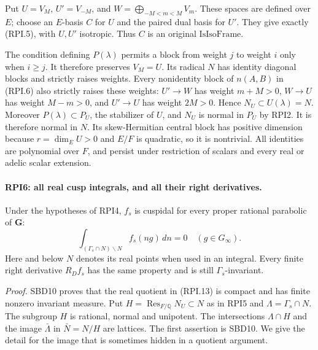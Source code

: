 Put \(U=V_M\), \(U'=V_{-M}\), and
\(W=\bigoplus_{-M<m<M}V_m\).  These spaces are defined over
\(E\); choose an \(E\)-basis \(C\) for \(U\) and the paired
dual basis for \(U'\).  They give exactly (RPI.5), with
\(U,U'\) isotropic.  Thus \(C\) is an original
\(\mathrm{IsIsoFrame}\).

The condition defining \(P(\lambda)\) permits a block from
weight \(j\) to weight \(i\) only when \(i\ge j\).
It therefore preserves \(V_M=U\).  Its radical \(N\) has
identity diagonal blocks and strictly raises weights.
Every nonidentity block of \(n(A,B)\) in (RPI.6) also strictly
raises these weights: \(U'\to W\) has weight \(m+M>0\),
\(W\to U\) has weight \(M-m>0\), and \(U'\to U\)
has weight \(2M>0\).  Hence \(N_U\subset U(\lambda)=N\).
Moreover \(P(\lambda)\subset P_U\), the stabilizer of \(U\),
and \(N_U\) is normal in \(P_U\) by RPI2.  It is therefore
normal in \(N\).  Its skew-Hermitian central block has
positive dimension because \(r=\dim_EU>0\) and \(E/F\)
is quadratic, so it is nontrivial.  All identities are
polynomial over \(F\), and persist under restriction of
scalars and every real or adelic scalar extension.

\paragraph{RPI6: all real cusp integrals, and all their right derivatives.}
\label{claim:RPI6}
Under the hypotheses of RPI4, \(f_s\) is cuspidal for every
proper rational parabolic of \(\mathbf G\):
\[
       \int_{(\Gamma_s\cap N)\backslash N} f_s(ng)\,dn=0
                       \quad(g\in G_\infty).
 \tag{RPI.13}
\]
Here and below \(N\) denotes its real points when used in
an integral.  Every finite right derivative \(R_Df_s\)
has the same property and is still \(\Gamma_s\)-invariant.

\emph{Proof.}
SBD10 proves that the real quotient in (RPI.13) is compact
and has finite nonzero invariant measure.  Put
\(H=\operatorname{Res}_{F/\mathbb Q}N_U\subset N\) as in RPI5
and \(\Lambda=\Gamma_s\cap N\).  The subgroup \(H\) is rational,
normal and unipotent.  The intersections \(\Lambda\cap H\)
and the image \(\bar\Lambda\) in \(\bar N=N/H\) are lattices.
The first assertion is SBD10.  We give the detail for the
image that is sometimes hidden in a quotient argument.

